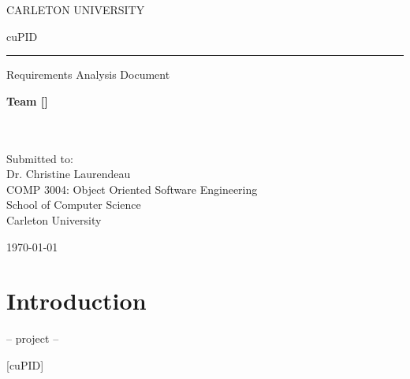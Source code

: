 \documentclass[12pt,letterpaper]{article}
\begin{document}
\begin{center}
	CARLETON UNIVERSITY
\end{center}

\vfill

\begin{center}
	{\fontsize{55pt}{55pt}\selectfont cuPID}
	\vspace{0.5em}\rule{\textwidth}{0.5pt}
	Requirements Analysis Document
\end{center}

\vspace{5em}

\begin{center}
	\textbf{Team [\teamname{}]}\\
	\personone{}\\
	\persontwo{}\\
	\personthree{}
\end{center}

\vfill

\begin{center}
	Submitted to:\\
	Dr. Christine Laurendeau\\
	COMP 3004: Object Oriented Software Engineering\\
	School of Computer Science\\
	Carleton University
\end{center}

\vspace{2em}

\begin{center}
	\today
\end{center}

\newpage{}

\tableofcontents{}

\renewcommand{\listfigurename}{Figures}
\listoffigures

\renewcommand{\listtablename}{Tables}
\listoftables

\newpage{}

\section{Introduction}

\begin{center}
    -- project --
\end{center}

\begin{center}
	\Huge [cuPID]
\end{center}
\end{document}
